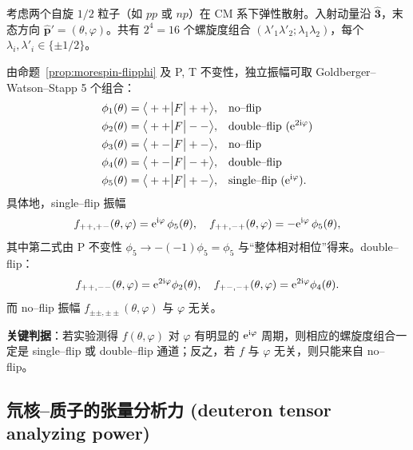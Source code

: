 \begin{example}
\label{ex:morespin-NN-flip}
考虑两个自旋 $1/2$ 粒子（如 $pp$ 或 $np$）在 CM 系下弹性散射。入射动量沿 $\hat{\bm 3}$，末态方向 $\hat{\bm p}'=(\theta,\varphi)$。共有 $2^4=16$ 个螺旋度组合 $(\lambda'_1\lambda'_2;\lambda_1\lambda_2)$，每个 $\lambda_i,\lambda'_i\in\{\pm 1/2\}$。

由命题~\ref{prop:morespin-flipphi} 及 P, T 不变性，独立振幅可取 Goldberger--Watson--Stapp 5 个组合：
\begin{align*}
\phi_1(\theta) &= \big\langle ++ \big| F \big| ++\big\rangle, & &\text{no--flip}\\
\phi_2(\theta) &= \big\langle ++ \big| F \big| --\big\rangle, & &\text{double--flip (} \mathrm{e}^{2\mathrm{i}\varphi}\text{)}\\
\phi_3(\theta) &= \big\langle +- \big| F \big| +-\big\rangle, & &\text{no--flip}\\
\phi_4(\theta) &= \big\langle +- \big| F \big| -+\big\rangle, & &\text{double--flip}\\
\phi_5(\theta) &= \big\langle ++ \big| F \big| +-\big\rangle, & &\text{single--flip (} \mathrm{e}^{\mathrm{i}\varphi}\text{)}.
\end{align*}
具体地，single--flip 振幅
\begin{equation}
f_{++,+-}(\theta,\varphi)=\mathrm{e}^{\mathrm{i}\varphi}\,\phi_5(\theta),\quad
f_{++,-+}(\theta,\varphi)=-\mathrm{e}^{\mathrm{i}\varphi}\,\phi_5(\theta),
\label{eq:morespin-NN-singleflip}
\end{equation}
其中第二式由 P 不变性 $\phi_5\to-(-1)\phi_5=\phi_5$ 与“整体相对相位”得来。double--flip：
$$
f_{++,--}(\theta,\varphi)=\mathrm{e}^{2\mathrm{i}\varphi}\phi_2(\theta),\quad f_{+-,-+}(\theta,\varphi)=\mathrm{e}^{2\mathrm{i}\varphi}\phi_4(\theta).
$$
而 no--flip 振幅 $f_{\pm\pm,\pm\pm}(\theta,\varphi)$ 与 $\varphi$ 无关。

\textbf{关键判据}：若实验测得 $f(\theta,\varphi)$ 对 $\varphi$ 有明显的 $\mathrm{e}^{\mathrm{i}\varphi}$ 周期，则相应的螺旋度组合一定是 single--flip 或 double--flip 通道；反之，若 $f$ 与 $\varphi$ 无关，则只能来自 no--flip。
\end{example}

\subsection{氘核–质子的张量分析力 (deuteron tensor analyzing power)}

